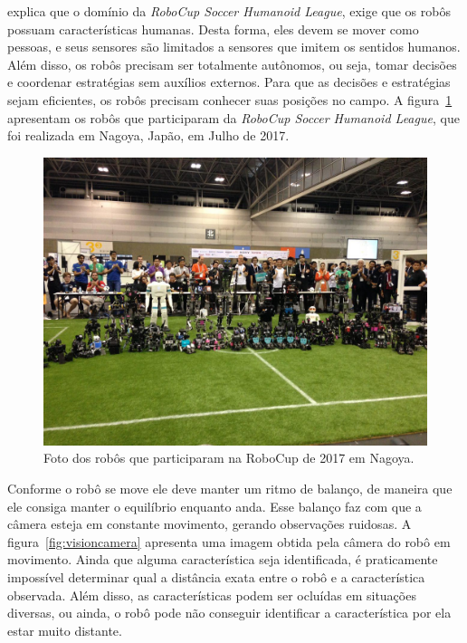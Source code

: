 \documentclass[
  12pt,       %
  oneside,
  a4paper,      %
  english,      %
  french,       %
  spanish,      %
  brazil,       %
  ]{abntex2}
\begin{document}
 explica que o domínio da \textit{RoboCup Soccer Humanoid League}, exige que os robôs possuam características humanas.
Desta forma, eles devem se mover como pessoas, e seus sensores são limitados a sensores que imitem os sentidos humanos.
Além disso, os robôs precisam ser totalmente autônomos, ou seja, tomar decisões e coordenar estratégias sem auxílios externos.
Para que as decisões e estratégias sejam eficientes, os robôs precisam conhecer suas posições no campo.
A figura~\ref{fig:robocup} apresentam os robôs que participaram da \textit{RoboCup Soccer Humanoid League}, que foi realizada em Nagoya, Japão, em Julho de 2017.

\begin{figure}[b]
  \centering
  \caption{Foto dos robôs que participaram na RoboCup de 2017 em Nagoya.}\label{fig:robocup}
    \includegraphics[width=\textwidth, trim={0 5cm 0 5cm}, clip]{fig/robocup2017}
\end{figure}

Conforme o robô se move ele deve manter um ritmo de balanço, de maneira que ele consiga manter o equilíbrio enquanto anda.
Esse balanço faz com que a câmera esteja em constante movimento, gerando observações ruidosas.
A figura~\ref{fig:visioncamera} apresenta uma imagem obtida pela câmera do robô em movimento.
Ainda que alguma característica seja identificada, é praticamente impossível determinar qual a distância exata entre o robô e a característica observada.
Além disso, as características podem ser ocluídas em situações diversas, ou ainda, o robô pode não conseguir identificar a característica por ela estar muito distante.
\end{document}
